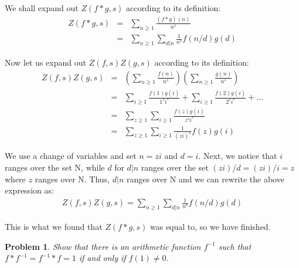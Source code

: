 \documentclass[psamsfonts]{amsart}
\newtheorem{prob}{Problem}[section]
\newenvironment{sol}{{\bfseries Solution}}{\qedsymbol}
\theoremstyle{definition}
\theoremstyle{remark}
\numberwithin{equation}{section}
\begin{document}
\begin{sol}
We shall expand out $Z(f*g,s)$ according to its definition:
\begin{eqnarray}
Z(f*g, s) &=& \sum_{n \geq 1} \frac{(f * g)(n)}{n^s} \\
&=& \sum_{n \geq 1} \sum_{d | n} \frac{1}{n^s} f(n/d) g(d) 
\end{eqnarray}

Now let us expand out $ Z(f,s) Z(g,s)$ according to its definition:
\begin{eqnarray}
 Z(f,s) Z(g,s) &=& \left( \sum_{n \geq 1} \frac{f(n)}{n^s} \right) \left( \sum_{n \geq 1} \frac{g(n)}{n^s} \right) \\
&=& \sum_{i \geq 1} \frac{f(1) g(i)}{1^s i^s} + \sum_{i \geq 1} \frac{f(2) g(i)}{2^s i^s} + \ldots \\
&=& \sum_{z \geq 1} \sum_{i \geq 1} \frac{f(z) g(i)}{z^s i^s} \\
&=& \sum_{z \geq 1} \sum_{i \geq 1} \frac{1}{(zi)^s} f(z) g(i)  
\end{eqnarray}

We use a change of variables and set $n = zi$ and $d = i$. Next, we notice that $i$ ranges over the set $\mathrm{N}$, while $d$ for $d | n$ ranges over the set $(zi)/d = (zi)/i = z$ where $z$ ranges over $\mathrm{N}$. Thus, $d | n$ ranges over $\mathrm{N}$ and we can rewrite the above expression as:
\begin{eqnarray}
 Z(f,s) Z(g,s) = \sum_{n \geq 1} \sum_{d | n} \frac{1}{n^s} f(n/d) g(d) 
\end{eqnarray} 

This is what we found that $Z(f*g,s)$ was equal to, so we have finished.
\end{sol}

\begin{prob}
Show that there is an arithmetic function $f^{-1}$ such that $f * f^{-1} = f^{-1} * f = 1$ if and only if $f(1) \neq 0$. 
\end{prob}
\end{document}
